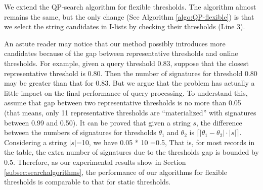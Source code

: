 We extend the QP-search algorithm for flexible thresholds. The algorithm almost remains the same, but  the only  change (See Algorithm \ref{algo:QP-flexible}) is that we select the string candidates in I-lists by checking their thresholds (Line 3).

An astute reader may notice that our method possibly introduces more candidates because of the gap between representative thresholds and online thresholds. For example, given a query threshold 0.83, suppose that the closest representative threshold is 0.80. Then  the number of signatures for threshold 0.80  may be greater than that for 0.83. But we argue that the problem  has actually a little impact on the final performance of query processing. To understand this, assume that gap between two representative thresholds is no more than 0.05 (that means, only 11 representative thresholds are ``materialized'' with signatures between 0.99 and 0.50). It can be proved that given a string $s$, the difference between the numbers of signatures for thresholds $\theta_1$ and $\theta_2$ is $\lceil  |\theta_1 - \theta_2|   \cdot |s| \rceil$. Considering a string $|s|$=10, we have 0.05 * 10 =0.5, That is, for most records in the table, the extra number of signatures due to the thresholds gap  is bounded by 0.5. Therefore, as our experimental results show in Section \ref{subsec:searchalgorithms}, the performance of our algorithms for flexible thresholds is comparable to that for static thresholds.



